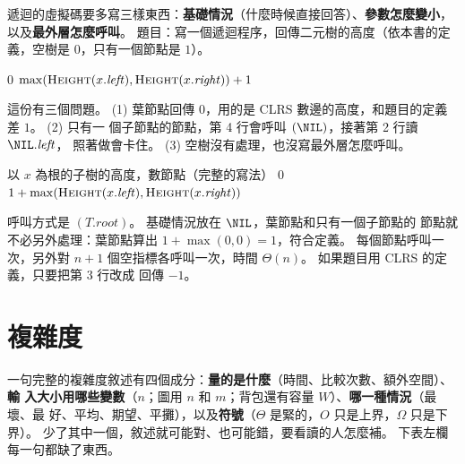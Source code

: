 遞迴的虛擬碼要多寫三樣東西：\textbf{基礎情況}（什麼時候直接回答）、\textbf{參數怎麼變小}，
以及\textbf{最外層怎麼呼叫}。 題目：寫一個遞迴程序，回傳二元樹的高度（依本書的定義，空樹是
$0$，只有一個節點是 $1$）。

\begin{exmbad}[基礎情況寫錯]
\begin{algorithmic}[1]
        \State \Return $0$
    \EndIf
    \State \Return $\max(\Call{Height}{x.\mathit{left}}, \Call{Height}{x.\mathit{right}}) + 1$
\EndFunction
\end{algorithmic}
\end{exmbad}

這份有三個問題。 (1) 葉節點回傳 $0$，用的是 CLRS 數邊的高度，和題目的定義差 $1$。 (2) 只有一
個子節點的節點，第 4 行會呼叫 $(\NIL)$，接著第 2 行讀 $\NIL.\mathit{left}$，
照著做會卡住。 (3) 空樹沒有處理，也沒寫最外層怎麼呼叫。

\begin{pseudo}[label=alg:exm-height]{以 $x$ 為根的子樹的高度，數節點（完整的寫法）}
        \State \Return $0$ 
    \EndIf
    \State \Return $1 + \max(\Call{Height}{x.\mathit{left}}, \Call{Height}{x.\mathit{right}})$
\EndFunction
\end{pseudo}

呼叫方式是 $(T.\mathit{root})$。 基礎情況放在 $\NIL$，葉節點和只有一個子節點的
節點就不必另外處理：葉節點算出 $1 + \max(0, 0) = 1$，符合定義。 每個節點呼叫一次，另外對
$n + 1$ 個空指標各呼叫一次，時間 $\Theta(n)$。 如果題目用 CLRS 的定義，只要把第 3 行改成
回傳 $-1$。

\section{複雜度}
\label{sec:exm-cost}

一句完整的複雜度敘述有四個成分：\textbf{量的是什麼}（時間、比較次數、額外空間）、\textbf{輸
入大小用哪些變數}（$n$；圖用 $n$ 和 $m$；背包還有容量 $W$）、\textbf{哪一種情況}（最壞、最
好、平均、期望、平攤），以及\textbf{符號}（$\Theta$ 是緊的，$O$ 只是上界，$\Omega$ 只是下
界）。 少了其中一個，敘述就可能對、也可能錯，要看讀的人怎麼補。 下表左欄每一句都缺了東西。

